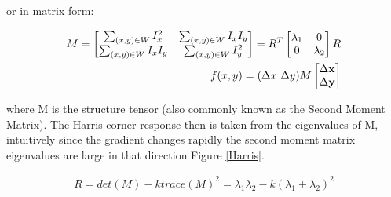 \documentclass[a4paper,11pt,notitlepage]{article}
\begin{document}
or in matrix form:

\begin{equation}
\begin{aligned}
M = 
\begin{bmatrix}
\sum_{(x,y) \in W} I_{x}^{2} & \sum_{(x,y) \in W} I_{x}I_{y} \\
\sum_{(x,y)\in W} I_{x}I_{y}& 
\sum_{(x,y)\in W} I_{y}^{2}
\end{bmatrix} = 
R^{T}
\begin{bmatrix}
\lambda_{1} & 0 \\
0 & \lambda_{2}
\end{bmatrix}
R
 \\
f(x,y) = (\Delta x \textnormal{ } \Delta y) M 
\begin{bmatrix}
\Delta \mathbf{x} \\
\Delta \mathbf{y}
\end{bmatrix}
\end{aligned}
\end{equation}

where M is the structure tensor (also commonly known as the Second Moment Matrix). The Harris corner response then is taken from the eigenvalues of M, intuitively since the gradient changes rapidly the second moment matrix eigenvalues are large in that direction Figure \ref{Harris}.


\begin{equation}
\begin{aligned}
R = det(M) - \mathit{k}trace(M)^{2} = \lambda_{1}\lambda_{2} - \mathit{k}(\lambda_{1} + \lambda_{2})^{2}
\end{aligned}
\end{equation}
\end{document}
